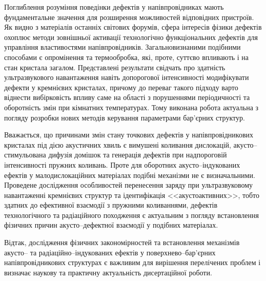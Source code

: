 Поглиблення розуміння поведінки дефектів у напівпровідниках мають фундаментальне значення для розширення можливостей відповідних пристроїв.
Як видно з матеріалів останніх світових форумів, сфера інтересів фізики дефектів охоплює методи  зовнішньої активації технологічно функціональних дефектів для управління властивостями напівпровідників.
Загальновизнаними подібними способами є опромінення та термообробка, які, проте, суттєво впливають і на стан кристала загалом.
%
Представлені результати свідчать про здатність ультразвукового навантаження навіть допорогової інтенсивності модифікувати дефекти у кремнієвих кристалах, причому до переваг такого підходу варто віднести вибірковість впливу саме на області з порушеннями періодичності та оборотність змін при кімнатних температурах.
Тому виконана робота актуальна з погляду розробки нових методів керування параметрами бар'єрних структур.

Вважається, що причинами змін стану точкових дефектів у напівпровідникових кристалах під дією акустичних хвиль є вимушені коливання дислокацій, акусто--стимульована дифузія домішок та генерація дефектів при надпороговій інтенсивності пружних коливань.
Проте для оборотних акусто--індукованих ефектів у малодислокаційних матеріалах
подібні механізми  не є визначальними.
Проведене дослідження особливостей перенесення заряду при ультразвуковому навантаженні кремнієвих структур та ідентифікація <<акустоактивних>>, тобто здатних до ефективної взаємодії з пружними коливаннями, дефектів технологічного та радіаційного походження
є актуальним з погляду встановлення фізичних причин акусто--дефектної взаємодії у подібних матеріалах.

Відтак,  дослідження фізичних  закономірностей  та встановлення механізмів акусто-- та радіаційно--індукованих
ефектів у поверхнево--бар'єрних напівпровідникових структурах  є  важливим  для  вирішення  перелічених  проблем  і визначає наукову та практичну актуальність дисертаційної роботи.


